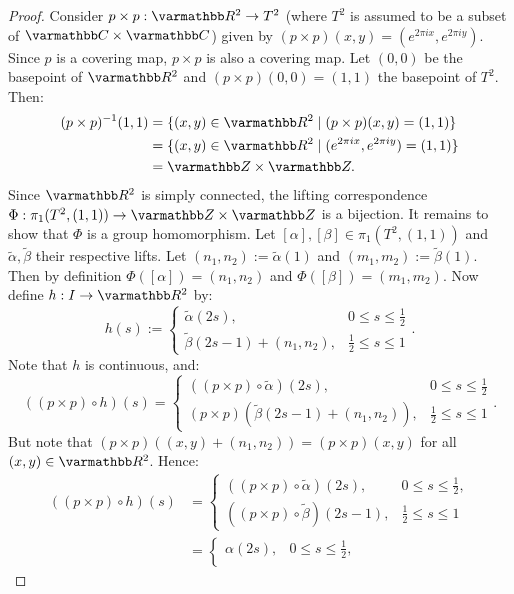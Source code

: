 \documentclass[10pt,oneside,openany]{memoir}
\begin{document}
	\begin{proof}
		Consider $p \times p:\bfR^2 \rightarrow T^2$ (where $T^2$ is assumed to be a subset of $\bfC \times \bfC$) given by $(p \times p)(x,y) = (e^{2 \pi i x}, e^{2 \pi i y})$. Since $p$ is a covering map, $p \times p$ is also a covering map. Let $(0,0)$ be the basepoint of $\bfR^2$ and $(p \times p)(0,0) = (1,1)$ the basepoint of $T^2$. Then:
		\begin{align*}
			(p \times p)^{-1}(1,1)
			&=  \{(x,y) \in \bfR^2 \mid (p \times p)(x,y) = (1,1)\} \\
			&= \{(x,y) \in \bfR^2 \mid (e^{2 \pi i x},e^{2 \pi i y}) = (1,1)\} \\
			& = \bfZ \times \bfZ.
		\end{align*}	
	Since $\bfR^2$ is simply connected, the lifting correspondence $\Phi:\pi_1(T^2, (1,1)) \rightarrow \bfZ \times \bfZ$ is a bijection. It remains to show that $\Phi$ is a group homomorphism. Let $[\alpha],[\beta] \in \pi_1(T^2,(1,1))$ and $\tilde{\alpha},\tilde{\beta}$ their respective lifts. Let $(n_1,n_2):= \tilde{\alpha}(1)$ and $(m_1,m_2) := \tilde{\beta}(1)$. Then by definition $\Phi([\alpha]) = (n_1,n_2)$ and $\Phi([\beta]) = (m_1,m_2)$. Now define $h:I \rightarrow \bfR^2$ by:
	\[
		h(s) := 
		\begin{cases}
			\tilde{\alpha}(2s), & 0 \leq s \leq \frac{1}{2} \\
			\tilde{\beta}(2s-1) + (n_1,n_2), & \frac{1}{2} \leq s \leq 1
		\end{cases}.
	\]
	Note that $h$ is continuous, and:
	\[
		((p \times p) \circ h)(s) =
		\begin{cases}
			((p \times p) \circ \tilde{\alpha})(2s), & 0\leq s \leq \frac{1}{2} \\
			(p \times p)( \tilde{\beta}(2s-1) + (n_1,n_2)), & \frac{1}{2} \leq s \leq 1
		\end{cases}.
	\] 
	But note that $(p \times p)((x,y)+(n_1,n_2)) = (p \times p)(x,y)$ for all $(x,y) \in \bfR^2$. Hence:
		\begin{align*}
			((p \times p) \circ h)(s) 
			&=\begin{cases}
				((p \times p) \circ \tilde{\alpha})(2s), & 0\leq s \leq \frac{1}{2},\\
				((p \times p) \circ \tilde{\beta})(2s-1), & \frac{1}{2} \leq s \leq 1
				\end{cases} \\
			&=\begin{cases}
				\alpha(2s), & 0\leq s \leq \frac{1}{2},\\

\end{cases}
\end{align*}
\end{proof}
\end{document}
